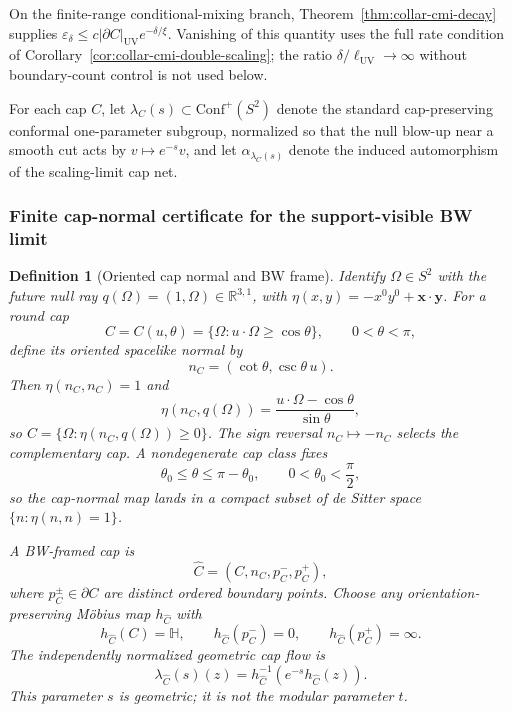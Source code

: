 \documentclass[11pt]{article}
\newtheorem{definition}[theorem]{Definition}
\newcommand{\Conf}{\mathrm{Conf}}
\begin{document}
On the finite-range conditional-mixing branch, Theorem~\ref{thm:collar-cmi-decay} supplies
\(\varepsilon_\delta\le c|\partial C|_{\mathrm{UV}}e^{-\delta/\xi}\). Vanishing of this
quantity uses the full rate condition of Corollary~\ref{cor:collar-cmi-double-scaling}; the ratio
\(\delta/\ell_{\mathrm{UV}}\to\infty\) without boundary-count control is not used below.

For each cap \(C\), let \(\lambda_C(s)\subset \Conf^+(S^2)\) denote the standard cap-preserving conformal one-parameter subgroup, normalized so that the null blow-up near a smooth cut acts by \(v\mapsto e^{-s}v\), and let \(\alpha_{\lambda_C(s)}\) denote the induced automorphism of the scaling-limit cap net.

\subsubsection{Finite cap-normal certificate for the support-visible BW limit}

\begin{definition}[Oriented cap normal and BW frame]\label{def:bw-framed-cap}
Identify \(\Omega\in S^2\) with the future null ray \(q(\Omega)=(1,\Omega)\in\mathbb R^{3,1}\),
with \(\eta(x,y)=-x^0y^0+\mathbf x\cdot\mathbf y\). For a round cap
\[
C=C(u,\theta)=\{\Omega:u\cdot\Omega\ge\cos\theta\},
\qquad 0<\theta<\pi,
\]
define its oriented spacelike normal by
\[
n_C=(\cot\theta,\csc\theta\,u).
\]
Then \(\eta(n_C,n_C)=1\) and
\[
\eta(n_C,q(\Omega))=\frac{u\cdot\Omega-\cos\theta}{\sin\theta},
\]
so \(C=\{\Omega:\eta(n_C,q(\Omega))\ge0\}\). The sign reversal \(n_C\mapsto -n_C\)
selects the complementary cap. A nondegenerate cap class fixes
\[
\theta_0\le \theta\le \pi-\theta_0,\qquad 0<\theta_0<\frac{\pi}{2},
\]
so the cap-normal map lands in a compact subset of de Sitter space
\(\{n:\eta(n,n)=1\}\).

A BW-framed cap is
\[
\widehat C=(C,n_C,p_C^-,p_C^+),
\]
where \(p_C^\pm\in\partial C\) are distinct ordered boundary points. Choose any
orientation-preserving M\"obius map \(h_{\widehat C}\) with
\[
h_{\widehat C}(C)=\mathbb H,\qquad
h_{\widehat C}(p_C^-)=0,\qquad
h_{\widehat C}(p_C^+)=\infty .
\]
The independently normalized geometric cap flow is
\[
\lambda_{\widehat C}(s)(z)
=h_{\widehat C}^{-1}(e^{-s}h_{\widehat C}(z)).
\]
This parameter \(s\) is geometric; it is not the modular parameter \(t\).
\end{definition}
\end{document}
